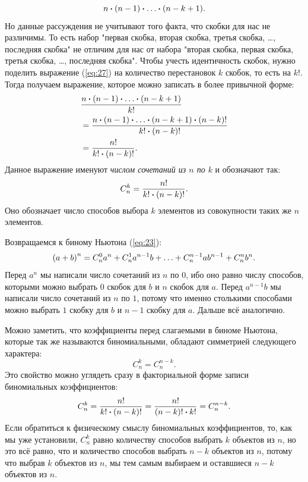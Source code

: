 \documentclass[12pt]{article}
\begin{document}
\begin{equation}\label{eq:27}
    n \vdot \qty(n-1) \vdot \ldots \vdot \qty(n-k+1).
\end{equation}
Но данные рассуждения не учитывают того факта, что скобки для нас не различимы. То есть набор "первая скобка, вторая скобка, третья скобка, \ldots , последняя скобка"{} не отличим для нас от набора "вторая скобка, первая скобка, третья скобка, \ldots , последняя скобка"{}. Чтобы учесть идентичность скобок, нужно поделить выражение (\ref{eq:27}) на количество перестановок $k$ скобок, то есть на $k!$. Тогда получаем выражение, которое можно записать в более привычной форме:
\begin{equation}
\begin{split}
    &\dfrac{n \vdot \qty(n-1) \vdot \ldots \vdot \qty(n-k+1)}{k!}\\
    &= \dfrac{n \vdot \qty(n-1) \vdot \ldots \vdot \qty(n-k+1) \vdot \qty(n-k)!}{k! \vdot \qty(n-k)!}\\
    &=\dfrac{n!}{k! \vdot \qty(n-k)!}.
\end{split}
\end{equation}
Данное выражение именуют \emph{числом сочетаний из $n$ по $k$} и обозначают так:
\begin{equation}
    C_{n}^{k} = \dfrac{n!}{k! \vdot \qty(n-k)!}.
\end{equation}
Оно обозначает число способов выбора $k$ элементов из совокупности таких же $n$ элементов.
\par
Возвращаемся к биному Ньютона (\ref{eq:23}):
\begin{equation}
    \qty(a+b)^n = C_{n}^0 a^n + C_{n}^1 a^{n-1}b + \ldots + C_{n}^{n-1} a b^{n-1} + C_{n}^{n} b^n.
\end{equation}
Перед $a^n$ мы написали число сочетаний из $n$ по $0$, ибо оно равно числу способов, которыми можно выбрать $0$ скобок для $b$ и $n$ скобок для $a$. Перед $a^{n-1}b$ мы написали число сочетаний из $n$ по $1$, потому что именно столькими способами можно выбрать $1$ скобку для $b$ и $n-1$ скобку для $a$. Дальше всё аналогично.
\par
Можно заметить, что коэффициенты перед слагаемыми в биноме Ньютона, которые так же называются биномиальными, обладают симметрией следующего характера:
\begin{equation}
    C_{n}^{k} = C_{n}^{n-k}.
\end{equation}
Это свойство можно углядеть сразу в факториальной форме записи биномиальных коэффициентов:
\begin{equation}
    C_{n}^{k} = \dfrac{n!}{k! \vdot \qty(n-k)!} = \dfrac{n!}{\qty(n-k)! \vdot k!} = C_{n}^{n-k}.
\end{equation}
Если обратиться к физическому смыслу биномиальных коэффициентов, то, как мы уже установили,  $C_{n}^{k}$ равно количеству способов выбрать $k$ объектов из $n$, но это всё равно, что и количество способов выбрать $n-k$ объектов из $n$, потому что выбрав $k$ объектов из $n$, мы тем самым выбираем и оставшиеся $n-k$ объектов из $n$.
\end{document}
